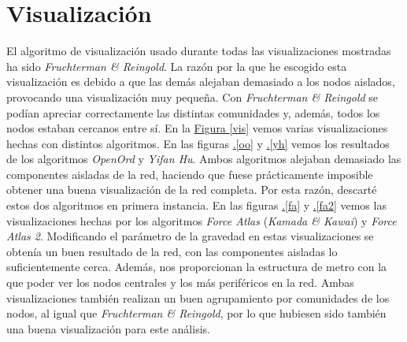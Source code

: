 \documentclass[10pt,a4paper,spanish]{article}
\numberwithin{equation}{section} %
\numberwithin{figure}{section} %
\numberwithin{table}{section} %
\begin{document}
\section{Visualización}
El algoritmo de visualización usado durante todas las visualizaciones mostradas ha sido \textit{Fruchterman \& Reingold}. La razón por la que he escogido esta visualización es debido a que las demás alejaban demasiado a los nodos aislados, provocando una visualización muy pequeña. Con \textit{Fruchterman \& Reingold} se podían apreciar correctamente las distintas comunidades y, además, todos los nodos estaban cercanos entre sí.  En la \hyperref[vis]{Figura \ref*{vis}} vemos varias visualizaciones hechas con distintos algoritmos. En las figuras \hyperref[oo]{\thesection .\ref*{oo}} y \hyperref[yh]{\thesection .\ref*{yh}} vemos los resultados de los algoritmos \textit{OpenOrd} y \textit{Yifan Hu}. Ambos algoritmos alejaban demasiado las componentes aisladas de la red, haciendo que fuese prácticamente imposible obtener una buena visualización de la red completa. Por esta razón, descarté estos dos algoritmos en primera instancia. En las figuras \hyperref[fa]{\thesection .\ref*{fa}} y \hyperref[fa2]{\thesection .\ref*{fa2}} vemos las visualizaciones hechas por los algoritmos \textit{Force Atlas} (\textit{Kamada \& Kawai}) y \textit{Force Atlas 2}. Modificando el parámetro de la gravedad en estas visualizaciones se obtenía un buen resultado de la red, con las componentes aisladas lo suficientemente cerca. Además, nos proporcionan la estructura de metro con la que poder ver los nodos centrales y los más periféricos en la red. Ambas visualizaciones también realizan un buen agrupamiento por comunidades de los nodos, al igual que \textit{Fruchterman \& Reingold}, por lo que hubiesen sido también una buena visualización para este análisis.
\end{document}

